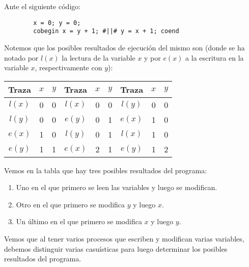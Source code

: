 \begin{ejemplo}
    Ante el siguiente código:
    \begin{verbatim}
        x = 0; y = 0;
        cobegin x = y + 1; #||# y = x + 1; coend
    \end{verbatim}
    Notemos que los posibles resultados de ejecución del mismo son (donde se ha notado por $l(x)$ la lectura de la variable $x$ y por $e(x)$ a la escritura en la variable $x$, respectivamente con $y$):
    \begin{table}[H]
    \centering
    \begin{tabular}{|c|c|c||c|c|c||c|c|c|}
        \hline
        Traza & $x$ & $y$ &Traza & $x$ & $y$ &Traza & $x$ & $y$ \\
        \hline
        $l(x)$ & 0 & 0 & $l(x)$ & 0 & 0 & $l(y)$ & 0 & 0      \\
        \hline                                                        
        $l(y)$ & 0 & 0 & $e(y)$ & 0 & 1 & $e(x)$ & 1 & 0  \\
        \hline                                                            
        $e(x)$ & 1 & 0 & $l(y)$ & 0 & 1 & $l(x)$ & 1 & 0      \\
        \hline                                                            
        $e(y)$ & 1 & 1 & $e(x)$ & 2 & 1 & $e(y)$ & 1 & 2  \\
        \hline
    \end{tabular}
    \end{table}
    Vemos en la tabla que hay tres posibles resultados del programa:
    \begin{enumerate}
        \item Uno en el que primero se leen las variables y luego se modifican.
        \item Otro en el que primero se modifica $y$ y luego $x$.
        \item Un último en el que primero se modifica $x$ y luego $y$.
    \end{enumerate}
    Vemos que al tener varios procesos que escriben y modifican varias variables, debemos distinguir varias casuísticas para luego determinar los posibles resultados del programa.\\


\end{ejemplo}
